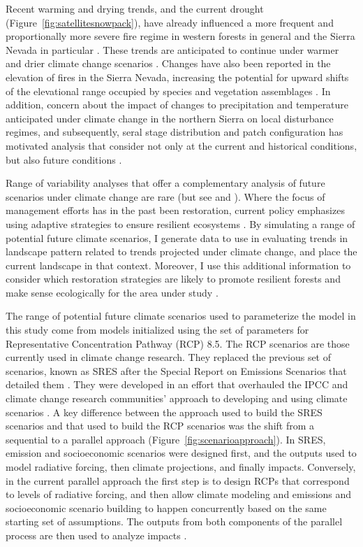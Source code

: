 Recent warming and drying trends, and the current drought (Figure~\ref{fig:satellitesnowpack}), have already influenced a more frequent and proportionally more severe fire regime in western forests in general and the Sierra Nevada in particular \citep{McKenzie2004,Westerling2011,Miller2012}. These trends are anticipated to continue under warmer and drier climate change scenarios \citep{Westerling2008,Dale2001}.  Changes have also been reported in the elevation of fires in the Sierra Nevada, increasing the potential for upward shifts of the elevational range occupied by species and vegetation assemblages \citep{Schwartz2015}. In addition, concern about the impact of changes to precipitation and temperature anticipated under climate change in the northern Sierra on local disturbance regimes, and subsequently, seral stage distribution and patch configuration has motivated analysis that consider not only at the current and historical conditions, but also future conditions \citep{Fule2008,North2012}. 

Range of variability analyses that offer a complementary analysis of future scenarios under climate change are rare (but see \cite{Keane2008} and \cite{Duveneck2014}). Where the focus of management efforts has in the past been restoration, current policy emphasizes using adaptive strategies to ensure resilient ecosystems \citep{Stephens2010}. By simulating a range of potential future climate scenarios, I generate data to use in evaluating trends in landscape pattern related to trends projected under climate change, and place the current landscape in that context. Moreover, I use this additional information to consider which restoration strategies are likely to promote resilient forests and make sense ecologically for the area under study \citep{Duncan2010}. 

The range of potential future climate scenarios used to parameterize the model in this study come from models initialized using the set of parameters for Representative Concentration Pathway (RCP) 8.5. The RCP scenarios are those currently used in climate change research. They replaced the previous set of scenarios, known as SRES after the Special Report on Emissions Scenarios that detailed them \citep{VanVuuren2011a}. They were developed in an effort that overhauled the IPCC and climate change research communities' approach to developing and using climate scenarios \citep{Moss2008}. A key difference between the approach used to build the SRES scenarios and that used to build the RCP scenarios was the shift from a sequential to a parallel approach (Figure~\ref{fig:scenarioapproach}). In SRES, emission and socioeconomic scenarios were designed first, and the outputs used to model radiative forcing, then climate projections, and finally impacts. Conversely, in the current parallel approach the first step is to design RCPs that correspond to levels of radiative forcing, and then allow climate modeling and emissions and socioeconomic scenario building to happen concurrently based on the same starting set of assumptions. The outputs from both components of the parallel process are then used to analyze impacts \citep{Moss2010}. 

